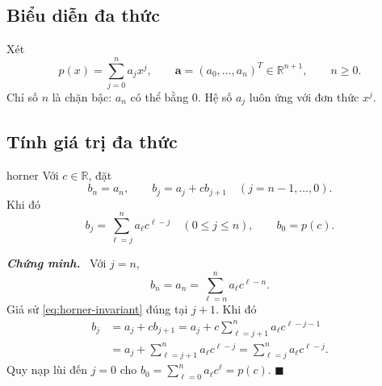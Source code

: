 \documentclass[12pt,a4paper,oneside]{book}
\numberwithin{algorithm}{chapter}
\theoremstyle{definition}
\newenvironment{chungminh}{\par\medskip\noindent\textbf{\textit{\color{mainblue}Chứng minh.}}\ }{\hfill$\blacksquare$\par\medskip}
\newcommand{\R}{\mathbb{R}}
\begin{document}
\subsection{Biểu diễn đa thức}
Xét
\[
 p(x)=\sum_{j=0}^{n}a_jx^j,\qquad \boldsymbol a=(a_0,\ldots,a_n)^T\in\R^{n+1},\qquad n\geq0.
\]
Chỉ số $n$ là chặn bậc: $a_n$ có thể bằng $0$. Hệ số $a_j$ luôn ứng với đơn thức $x^j$.

\subsection{Tính giá trị đa thức}
\begin{dinhly}{}{horner}
Với $c\in\R$, đặt
\begin{equation}\label{eq:horner}
 b_n=a_n,\qquad b_j=a_j+cb_{j+1}\quad(j=n-1,\ldots,0).
\end{equation}
Khi đó
\begin{equation}\label{eq:horner-invariant}
 b_j=\sum_{\ell=j}^{n}a_\ell c^{\ell-j}\quad(0\leq j\leq n),
 \qquad b_0=p(c).
\end{equation}
\end{dinhly}
\begin{chungminh}
Với $j=n$,
\[
 b_n=a_n=\sum_{\ell=n}^{n}a_\ell c^{\ell-n}.
\]
Giả sử \eqref{eq:horner-invariant} đúng tại $j+1$. Khi đó
\begin{align*}
 b_j&=a_j+cb_{j+1}
 =a_j+c\sum_{\ell=j+1}^{n}a_\ell c^{\ell-j-1}\\
 &=a_j+\sum_{\ell=j+1}^{n}a_\ell c^{\ell-j}
 =\sum_{\ell=j}^{n}a_\ell c^{\ell-j}.
\end{align*}
Quy nạp lùi đến $j=0$ cho $b_0=\sum_{\ell=0}^{n}a_\ell c^\ell=p(c)$.
\end{chungminh}
\end{document}

